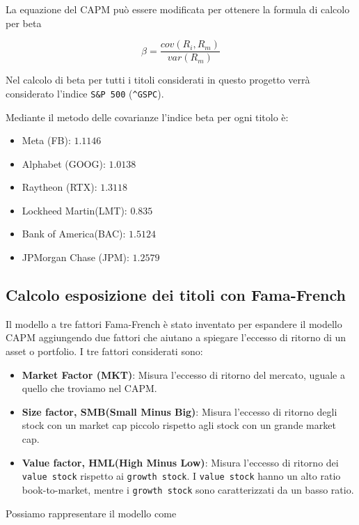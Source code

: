 La equazione del CAPM può essere modificata per ottenere la formula di calcolo per beta

\begin{displaymath}
    \beta = \frac{cov(R_i,R_m)}{var(R_m)}
\end{displaymath}

Nel calcolo di beta per tutti i titoli considerati in questo progetto verrà considerato l'indice \verb|S&P 500| (\verb|^GSPC|).

Mediante il metodo delle covarianze l'indice beta per ogni titolo è:
\begin{itemize}
    \item Meta (FB): $1.1146$
    \item Alphabet (GOOG): $1.0138$
    \item Raytheon (RTX): $1.3118$
    \item Lockheed Martin(LMT): $0.835$
    \item Bank of America(BAC): $1.5124$
    \item JPMorgan Chase (JPM): $1.2579$
\end{itemize}

\pagebreak

\subsection{Calcolo esposizione dei titoli con Fama-French}

Il modello a tre fattori Fama-French è stato inventato per espandere il modello CAPM aggiungendo due fattori
che aiutano a spiegare l'eccesso di ritorno di un asset o portfolio. I tre fattori considerati sono:
\begin{itemize}
    \item \textbf{Market Factor (MKT)}: Misura l'eccesso di ritorno del mercato, uguale a quello che troviamo nel CAPM.
    \item \textbf{Size factor, SMB(Small Minus Big)}: Misura l'eccesso di ritorno degli stock con un market cap piccolo rispetto agli stock con un grande market cap.
    \item \textbf{Value factor, HML(High Minus Low)}: Misura l'eccesso di ritorno dei \verb|value stock| rispetto ai \verb|growth stock|.
    I \verb|value stock| hanno un alto ratio book-to-market, mentre i \verb|growth stock| sono caratterizzati da un basso ratio.
\end{itemize}

Possiamo rappresentare il modello come


